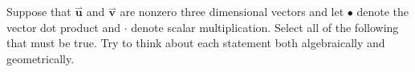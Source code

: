 \documentclass{ximera}
\author{Jim Talamo}
\begin{document}
\begin{exercise}
Suppose that $\overset{\boldsymbol{\rightharpoonup}}{\mathbf{u}}$ and $\overset{\boldsymbol{\rightharpoonup}}{\mathbf{v}}$ are nonzero three dimensional vectors and let $\bullet$ denote the vector dot product and $\cdot$ denote scalar multiplication.  Select all of the following that must be true.  Try to think about each statement both algebraically and geometrically.

\begin{selectAll}

\end{selectAll}
\end{exercise}
\end{document}
